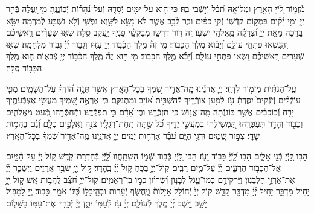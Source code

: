 \documentclass[twoside, openany, parskip=half, 11pt]{book}
\begin{document}
\tachanunim

\vfill




\begin{small}
מִ֫זְמ֥וֹר
לַ֭יְֿיָ הָאָ֣רֶץ וּמְלוֹאָ֑הּ תֵּ֝בֵ֗ל וְֿי֣שְֿׁבֵי בָֽהּ׃
כִּי־ה֖וּא עַל־יַמִּ֣ים יְֿסָדָ֑הּ וְֿעַל־נְ֝הָר֗וֹת יְֿכֽוֹנֲנֶֽהָ׃
מִ֥י ֖יַֽעֲלֶה בְּֿהַ֣ר יְיָ֑ וּמִ֥י־יָ֝ק֗וּם בִּמְק֥וֹם קָדְֿשֽׁוֹ׃
נְֿקִ֥י כַפַּ֗יִם וּבַ֢ר לֵ֫בָ֥ב אֲשֶׁ֤ר לֹֽא־נָשָׂ֣א לַשָּׁ֣וְא נַפְשִׁ֑י וְֿלֹ֖א נִשְׁבַּ֣ע לְֿמִרְמָֽה׃
יִשָּׂ֣א בְֿ֭רָכָה מֵאֵ֣ת יְיָ֑ וּ֝צְדָקָ֗ה מֵֽאֱלֹהֵ֥י יִשְׁעֽוֹ׃
זֶ֭ה דּ֣וֹר דֹּרְֿשָׁ֑ו מְֿבַקְשֵׁ֥֨י פָנֶי֖ךָ יַֽעֲקֹ֣ב סֶֽלָה׃
שְֿׂא֤וּ שְֿׁעָרִ֨ים רָֽאשֵׁיכֶ֗ם וְֿ֭הִנָּֽשְׂאוּ פִּתְחֵ֣י עוֹלָ֑ם וְֿ֝יָב֗וֹא מֶ֣לֶךְ הַכָּבֽוֹד׃
מִ֥י זֶה֘ מֶ֤לֶךְ הַכָּ֫ב֥וֹד יְ֖יָ עִזּ֣וּז וְֿגִבּ֑וֹר יְ֜יָ֗ גִּבּ֥וֹר מִלְחָמָֽה׃
שְֿׂא֤וּ שְֿׁעָרִים רָֽאשֵׁיכֶ֗ם וּ֭שְׂאוּ פִּתְחֵ֣י עוֹלָ֑ם וְֿ֝יָבֹ֗א מֶ֣לֶךְ הַכָּבֽוֹד׃
מִ֤י ה֣וּא זֶה֘ מֶ֢לֶךְ הַכָּ֫ב֥וֹד יְיָ֥ צְֿבָא֑וֹת ה֤וּא מֶ֖לֶךְ הַכָּב֣וֹד סֶֽלָה׃


עַֽל־הַגִּתִּ֗ית מִזְמ֥וֹר לְֿדָוִֽד׃
יְיָ֤ אֲדֹנֵ֗ינוּ מָֽה־אַדִּ֣יר שִׁ֭מְךָ בְּֿכׇל־הָאָ֑רֶץ אֲשֶׁ֥ר תְּֿנָ֥ה ה֝וֹדְֿךָ֗ עַל־הַשָּׁמָֽיִם׃
מִפִּ֤י עֽוֹלְֿלִ֨ים וְֽֿיֹנְֿקִים֮ יִסַּ֪דְתָּ֫ עֹ֥ז לְֿמַ֥עַן צוֹרְֿרֶ֑יךָ לְֿהַשְׁבִּ֥ית א֝וֹיֵ֗ב וּמִתְנַקֵּֽם׃
כִּֽי־אֶרְאֶ֣ה שָׁ֭מֶיךָ מַעֲשֵׂ֣י אֶצְבְּֿעֹתֶ֑יךָ יָרֵ֥חַ וְֿ֝כוֹכָבִ֗ים אֲשֶׁ֣ר כּוֹנָֽנְֿתָּה׃
מָֽה־אֱנ֥וֹשׁ כִּֽי־תִזְכְּֿרֶ֑נּוּ וּבֶן־אָ֝דָ֗ם כִּ֣י תִפְקְֿדֶֽנּוּ׃
וַתְּֿחַסְּֿרֵ֣הוּ מְּֿ֭עַט מֵאֱלֹהִ֑ים וְֿכָב֖וֹד וְֿהָדָ֣ר תְּֿעַטְּֿרֵֽהוּ׃
תַּ֭מְשִׁילֵהוּ בְּֿמַעֲשֵׂ֣י יָדֶ֑יךָ כֹּ֝ל שַׁ֣תָּה תַֽחַת־רַגְלָֽיו׃
צֹנֶ֣ה וַאֲלָפִ֣ים כֻּלָּ֑ם וְֿ֝גַ֗ם בַּהֲמ֥וֹת שָׂדָֽי׃
צִפּ֣וֹר שָׁ֭מַיִם וּדְגֵ֣י הַיָּ֑ם עֹ֝בֵ֗ר אָרְֿח֥וֹת יַמִּֽים׃
יְיָ֥ אֲדֹנֵ֑ינוּ מָֽה־אַדִּ֥יר שִׁ֝מְךָ֗ בְּֿכׇל־הָאָֽרֶץ׃



הָב֣וּ לַ֭יְֿיָ בְּֿנֵ֣י אֵלִ֑ים הָב֥וּ לַֽ֝יְֿיָ֗ כָּב֥וֹד וָעֹֽז׃
הָב֣וּ לַ֭יְֿיָ כְּֿב֣וֹד שְֿׁמ֑וֹ הִשְׁתַּֽחֲו֥וּ לַֽ֝יְֿיָ֗ בְּֿהַדְרַת־קֹֽדֶשׁ׃
ק֥וֹל יְיָ֗ עַל־הַ֫מָּ֥יִם אֵֽל־הַכָּב֥וֹד הִרְעִ֑ים יְ֜יָ֗ עַל־מַ֥יִם רַבִּֽים׃
קֽוֹל־יְֿיָ֥ בַּכֹּ֑חַ ק֥וֹל יְ֜יָ֗ בֶּֽהָדָר׃
ק֣וֹל יְ֖יָ֥ שֹׁבֵ֣ר אֲרָזִ֑ים וַיְֿשַׁבֵּ֥ר יְ֜יָ֗ אֶת־אַרְזֵ֥י הַלְּֿבָנֽוֹן׃
וַיַּרְקִידֵ֥ם כְּֿמוֹ־עֵ֑גֶל לְֿבָנ֥וֹן וְֿ֝שִׂרְי֗וֹן כְּֿמ֣וֹ בֶן־רְאֵמִֽים׃
קֽוֹל־יְֿיָ֥ חֹ֝צֵ֗ב לַֽהֲב֥וֹת אֵֽשׁ׃
ק֣וֹל יְ֖יָ֥ יָחִ֣יל מִדְבָּ֑ר יָחִ֥יל יְ֜יָ֗ מִדְבַּ֣ר קָדֵֽשׁ׃
ק֣וֹל יְיָ֙ יְֿחוֹלֵ֣ל אַיָּלוֹת֘ וַיֶּֽחֱשׂ֢ף יְֿעָ֫ר֥וֹת וּבְהֵֽיכָל֑וֹ כֻּ֝לּ֗וֹ אֹמֵ֥ר כָּבֽוֹד׃
יְ֖יָ לַמַּבּ֣וּל יָשָׁ֑ב וַיֵּ֥שֶׁב יְ֜יָ֗ מֶ֣לֶךְ לְֿעוֹלָֽם׃
יְיָ֗ עֹ֖ז לְֿעַמּ֣וֹ יִתֵּ֑ן יְיָ֓ יְֿבָרֵ֖ךְ אֶת־עַמּ֣וֹ בַשָּׁלֽוֹם׃

\end{small}
\end{document}

